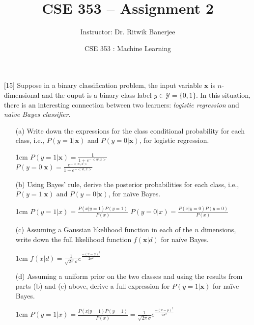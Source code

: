 \documentclass[11pt, fleqn]{exam}
\title{CSE 353 -- \examnum}
\author{Instructor: Dr. Ritwik Banerjee}
\date{}
\newcommand{\class}{CSE 353 : Machine Learning}
\newcommand{\examnum}{Assignment 2}
\newenvironment{mathline}{\begin{adjustwidth}{1cm}{}}{\end{adjustwidth}}
\begin{document}
\title{\examnum}
\author{\class}
\date{}
\maketitle

\begin{questions}
\pointsinrightmargin

\addpoints

[15]
Suppose in a binary classification problem, the input variable $\mathbf{x}$ is $n$-dimensional and the ouput is a binary class label $y \in \mathcal{Y} = \{0,1\}$. In this situation, there is an interesting connection between two learners: \textit{logistic regression} and \textit{na\"{i}ve Bayes classifier}.
\begin{itemize}
\item[(a)] Write down the expressions for the class conditional probability for each class, i.e., $P(y=1|\mathbf{x})$ and $P(y=0|\mathbf{x})$, for logistic regression.

\begin{mathline}
$P(y=1|\mathbf{x})=\frac{1}{1+e^{-<w,x>}}$\\
$P(y=0|\mathbf{x})=\frac{e^{-<w,x>}}{1+e^{-<w,x>}}$
\end{mathline}

\item[(b)] Using Bayes' rule, derive the posterior probabilities for each class, i.e., $P(y=1|\mathbf{x})$ and $P(y=0|\mathbf{x})$, for na\"{i}ve Bayes.

\begin{mathline}
$P(y=1|x)=\frac{P(x|y=1)P(y=1)}{P(x)}$
$P(y=0|x)=\frac{P(x|y=0)P(y=0)}{P(x)}$
\end{mathline}

\item[(c)] Assuming a Gaussian likelihood function in each of the $n$ dimensions, write down the full likelihood function $f(\mathbf{x}|d)$ for na\"{i}ve Bayes.

\begin{mathline}
$f(x|d)=\frac{1}{\sqrt{2\pi}\sigma}e^\frac{-(x-\mu)^2}{2\sigma^2}$
\end{mathline}

\item[(d)] Assuming a uniform prior on the two classes and using the results from parts (b) and (c) above, derive a full expression for $P(y=1|\mathbf{x})$ for na\"{i}ve Bayes.

\begin{mathline}
$P(y=1|x)=\frac{P(x|y=1)P(y=1)}{P(x)}=\frac{1}{\sqrt{2\pi}\sigma}e^\frac{-(x-\mu)^2}{2\sigma^2}$
\end{mathline}



\end{itemize}
\end{questions}
\end{document}
